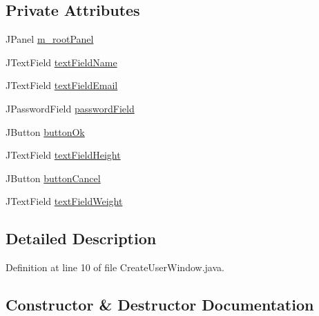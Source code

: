 \subsection*{Private Attributes}
\begin{DoxyCompactItemize}
\item 
J\+Panel \mbox{\hyperlink{classcom_1_1activitytracker_1_1_create_user_window_a5a678326afe519b6a2c9e7a2d9eff87c}{m\+\_\+root\+Panel}}
\item 
J\+Text\+Field \mbox{\hyperlink{classcom_1_1activitytracker_1_1_create_user_window_aa2b8cf1781a8a1534dbf5c5b98332c05}{text\+Field\+Name}}
\item 
J\+Text\+Field \mbox{\hyperlink{classcom_1_1activitytracker_1_1_create_user_window_a4f6010631cb7be5a2ae3691bdca31483}{text\+Field\+Email}}
\item 
J\+Password\+Field \mbox{\hyperlink{classcom_1_1activitytracker_1_1_create_user_window_a29be9c267c003ae90731199d8257dc0a}{password\+Field}}
\item 
J\+Button \mbox{\hyperlink{classcom_1_1activitytracker_1_1_create_user_window_aa22864c8baa65b46fe9a7621748d7841}{button\+Ok}}
\item 
J\+Text\+Field \mbox{\hyperlink{classcom_1_1activitytracker_1_1_create_user_window_ac5ce2bc2efbc06d578d93fb3f26aad1c}{text\+Field\+Height}}
\item 
J\+Button \mbox{\hyperlink{classcom_1_1activitytracker_1_1_create_user_window_a975a5cc35d145a3efa4d9e340776ca63}{button\+Cancel}}
\item 
J\+Text\+Field \mbox{\hyperlink{classcom_1_1activitytracker_1_1_create_user_window_ae84b4d977150419bfabc11fbd009392c}{text\+Field\+Weight}}
\end{DoxyCompactItemize}


\subsection{Detailed Description}


Definition at line 10 of file Create\+User\+Window.\+java.



\subsection{Constructor \& Destructor Documentation}
\mbox{\label{classcom_1_1activitytracker_1_1_create_user_window_a46b8b719c490fe8f658fa7a1f27d0be7}} 
